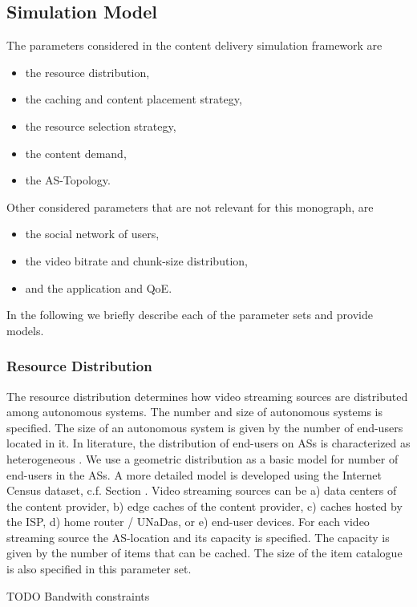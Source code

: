 \subsection{Simulation Model}\label{sec:simeval}

The parameters considered in the content delivery simulation framework are
\begin{itemize}
  \item the resource distribution,
  \item the caching and content placement strategy,
  \item the resource selection strategy,
  \item the content demand,
  \item the AS-Topology.
\end{itemize}
Other considered parameters that are not relevant for this monograph, are
\begin{itemize}
  \item the social network of users,
  \item the video bitrate and chunk-size distribution,
  \item and the application and QoE.
\end{itemize}
In the following we briefly describe each of the parameter sets and provide models.

\subsubsection{Resource Distribution}
The resource distribution determines how video streaming sources are distributed among autonomous systems.
The number and size of autonomous systems is specified.
The size of an autonomous system is given by the number of end-users located in it.
In literature, the distribution of end-users on ASs is characterized as heterogeneous \cite{}.
We use a geometric distribution as a basic model for number of end-users in the ASs.
A more detailed model is developed using the Internet Census dataset, c.f. Section .
Video streaming sources can be a) data centers of the content provider, b) edge caches of the content provider, c) caches hosted by the ISP, d) home router / UNaDas, or e) end-user devices.
For each video streaming source the AS-location and its capacity is specified.
The capacity is given by the number of items that can be cached.
The size of the item catalogue is also specified in this parameter set.

TODO Bandwith constraints

